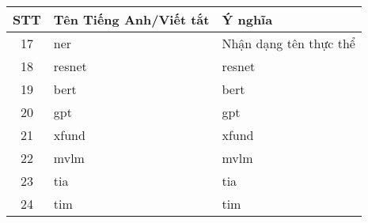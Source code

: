 \documentclass[a4paper]{report}
\begin{document}
\begin{center}
  \begin{tabular}{| c | m{6.5cm} | m{6.0cm} |}
  \hline
  \textbf{STT} & \textbf{Tên Tiếng Anh/Viết tắt} & \textbf{Ý nghĩa} \\ 
  \hline
  17 & \acrfull*{ner} & Nhận dạng tên thực thể \\ 
  \hline
  18 & \acrshort*{resnet} & \acrlong*{resnet} \\ 
  \hline
  19 & \acrshort*{bert} & \acrlong*{bert} \\ 
  \hline
  20 & \acrshort*{gpt} & \acrlong*{gpt} \\ 
  \hline
  21 & \acrshort*{xfund} & \acrlong*{xfund} \\ 
  \hline
  22 & \acrshort*{mvlm} & \acrlong*{mvlm} \\ 
  \hline
  23 & \acrshort*{tia} & \acrlong*{tia} \\ 
  \hline
  24 & \acrshort*{tim} & \acrlong*{tim} \\ 
  \hline
\end{tabular}
\end{center}

\newpage


\newpage

\newpage


\newpage


\newpage

\newpage

\newpage


\newpage
{}
\printbibliography[heading=talikarng]
\end{document}
